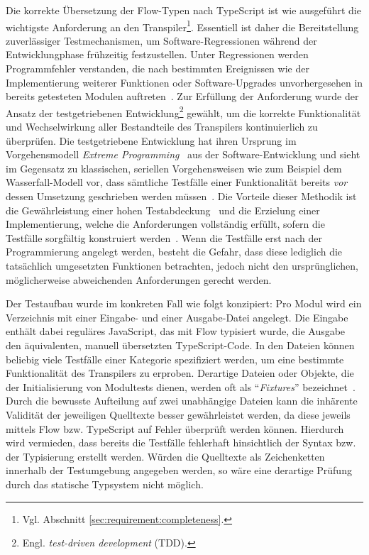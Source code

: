 Die korrekte Übersetzung der Flow-Typen nach TypeScript ist wie ausgeführt die wichtigste Anforderung an den Transpiler\footnote{Vgl. Abschnitt \ref{sec:requirement:completeness}.}. Essentiell ist daher die Bereitstellung zuverlässiger Testmechanismen, um Software-Regressionen während der Entwicklungphase frühzeitig festzustellen. Unter Regressionen werden Programmfehler verstanden, die nach bestimmten Ereignissen wie der Implementierung weiterer Funktionen oder Software-Upgrades unvorhergesehen in bereits getesteten Modulen auftreten~\autocite[218]{DOR:SOFTWARE_TEST}. Zur Erfüllung der Anforderung wurde der Ansatz der testgetriebenen Entwicklung\footnote{Engl. \textit{test-driven development} (TDD).} gewählt, um die korrekte Funktionalität und Wechselwirkung aller Bestandteile des Transpilers kontinuierlich zu überprüfen. Die testgetriebene Entwicklung hat ihren Ursprung im Vorgehensmodell \textit{Extreme Programming}~\autocite{JEFFRIES:EXTREME_PROGRAMMING} aus der Software-Entwicklung und sieht im Gegensatz zu klassischen, seriellen Vorgehensweisen wie zum Beispiel dem Wasserfall-Modell vor, dass sämtliche Testfälle einer Funktionalität bereits \emph{vor} dessen Umsetzung geschrieben werden müssen~\autocite{BECK:EXTREME_PROGRAMMING}. Die Vorteile dieser Methodik ist die Gewährleistung einer hohen Testabdeckung~\autocite[90]{BECK:TDD} und die Erzielung einer Implementierung, welche die Anforderungen vollständig erfüllt, sofern die Testfälle sorgfältig konstruiert werden~\autocite[214]{BECK:TDD}. Wenn die Testfälle erst nach der Programmierung angelegt werden, besteht die Gefahr, dass diese lediglich die tatsächlich umgesetzten Funktionen betrachten, jedoch nicht den ursprünglichen, möglicherweise abweichenden Anforderungen gerecht werden.

Der Testaufbau wurde im konkreten Fall wie folgt konzipiert: Pro Modul wird ein Verzeichnis mit einer Ein\-gabe- und einer Ausgabe-Datei angelegt. Die Eingabe enthält dabei reguläres JavaScript, das mit Flow typisiert wurde, die Ausgabe den äquivalenten, manuell übersetzten TypeScript-Code. In den Dateien können beliebig viele Testfälle einer Kategorie spezifiziert werden, um eine bestimmte Funktionalität des Transpilers zu erproben. Derartige Dateien oder Objekte, die der Initialisierung von Modultests dienen, werden oft als \enquote{\textit{Fixtures}} bezeichnet~\autocite{OLAN:2003}. Durch die bewusste Aufteilung auf zwei unabhängige Dateien kann die inhärente Validität der jeweiligen Quelltexte besser gewährleistet werden, da diese jeweils mittels Flow bzw. TypeScript auf Fehler überprüft werden können. Hierdurch wird vermieden, dass bereits die Testfälle fehlerhaft hinsichtlich der Syntax bzw. der Typisierung erstellt werden. Würden die Quelltexte als Zeichenketten innerhalb der Testumgebung angegeben werden, so wäre eine derartige Prüfung durch das statische Typsystem nicht möglich.

